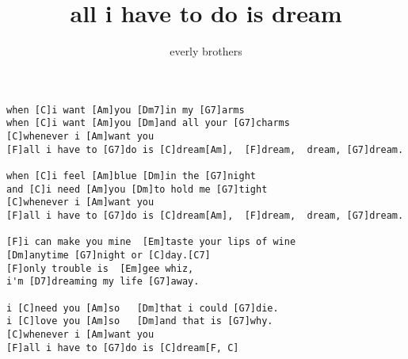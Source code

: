 \author{everly brothers}
\title{all i have to do is dream}
\maketitle
\begin{verbatim}
when [C]i want [Am]you [Dm7]in my [G7]arms
when [C]i want [Am]you [Dm]and all your [G7]charms
[C]whenever i [Am]want you
[F]all i have to [G7]do is [C]dream[Am],  [F]dream,  dream, [G7]dream.

when [C]i feel [Am]blue [Dm]in the [G7]night
and [C]i need [Am]you [Dm]to hold me [G7]tight
[C]whenever i [Am]want you
[F]all i have to [G7]do is [C]dream[Am],  [F]dream,  dream, [G7]dream.

[F]i can make you mine  [Em]taste your lips of wine
[Dm]anytime [G7]night or [C]day.[C7]
[F]only trouble is  [Em]gee whiz,
i'm [D7]dreaming my life [G7]away.

i [C]need you [Am]so   [Dm]that i could [G7]die.
i [C]love you [Am]so   [Dm]and that is [G7]why.
[C]whenever i [Am]want you
[F]all i have to [G7]do is [C]dream[F, C]
\end{verbatim}